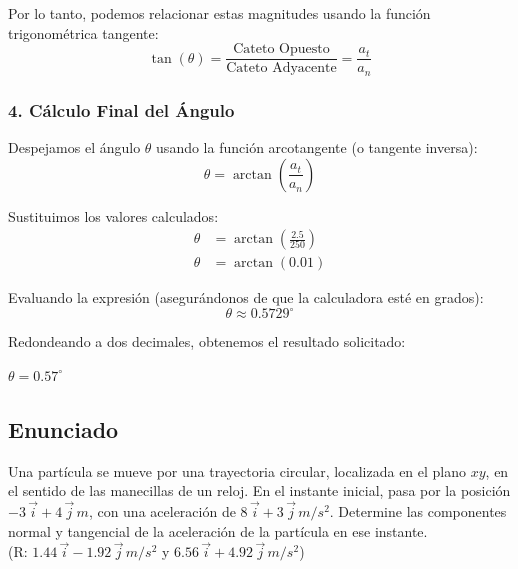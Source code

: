 \documentclass[12pt, a4paper]{article}
\begin{document}
Por lo tanto, podemos relacionar estas magnitudes usando la función trigonométrica tangente:
$$ \tan(\theta) = \frac{\text{Cateto Opuesto}}{\text{Cateto Adyacente}} = \frac{a_t}{a_n} $$

\subsubsection*{4. Cálculo Final del Ángulo}
Despejamos el ángulo $\theta$ usando la función arcotangente (o tangente inversa):
$$ \theta = \arctan\left(\frac{a_t}{a_n}\right) $$

Sustituimos los valores calculados:
\begin{align*}
    \theta &= \arctan\left(\frac{2.5}{250}\right) \\
    \theta &= \arctan(0.01)
\end{align*}

Evaluando la expresión (asegurándonos de que la calculadora esté en grados):
$$ \theta \approx 0.5729^\circ $$

Redondeando a dos decimales, obtenemos el resultado solicitado:

\begin{tcolorbox}[colback=green!5!white, colframe=green!50!black, title=Respuesta Final]
\centering \Large $\theta = 0.57^\circ$
\end{tcolorbox}

\newpage

\subsection*{Enunciado}
Una partícula se mueve por una trayectoria circular, localizada en el plano $xy$, en el sentido de las manecillas de un reloj. En el instante inicial, pasa por la posición $-3 \, \vec{i} + 4 \, \vec{j} \, \si{m}$, con una aceleración de $8 \, \vec{i} + 3 \, \vec{j} \, \si{m/s^2}$. Determine las componentes normal y tangencial de la aceleración de la partícula en ese instante. \\
(R: $1.44 \, \vec{i} - 1.92 \, \vec{j} \, \si{m/s^2}$ y $6.56 \, \vec{i} + 4.92 \, \vec{j} \, \si{m/s^2}$)
\end{document}
